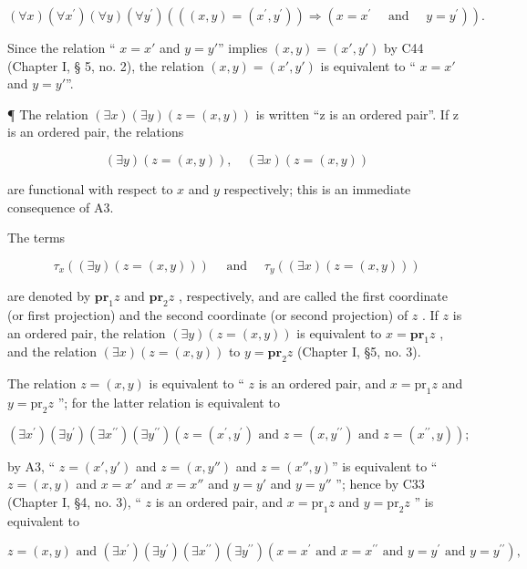 \[
(\forall x) (\forall x ^ {\prime}) (\forall y) (\forall y ^ {\prime}) (((x, y) = (x ^ {\prime}, y ^ {\prime})) \Longrightarrow (x = x ^ {\prime} \quad \text { and } \quad y = y ^ {\prime})). \tag {A3.}
\]

Since the relation `` \(x = x'\) and \(y = y'\)'' implies \((x, y) = (x', y')\) by C44 (Chapter I, § 5, no. 2), the relation \((x, y) = (x', y')\) is equivalent to `` \(x = x'\) and \(y = y'\)''.

¶ The relation \((\exists x)(\exists y)(z=(x,y))\) is written ``z is an ordered pair''. If z is an ordered pair, the relations

\[
(\exists y) (z = (x, y)), \quad (\exists x) (z = (x, y))
\]

are functional with respect to \(x\) and \(y\) respectively; this is an immediate consequence of A3.

The terms

\[
\tau_ {x} ((\exists y) (z = (x, y))) \quad \text { and } \quad \tau_ {y} ((\exists x) (z = (x, y)))
\]

are denoted by \(\mathbf{pr}_1z\) and \(\mathbf{pr}_2z\) , respectively, and are called the first coordinate (or first projection) and the second coordinate (or second projection) of \(z\) . If \(z\) is an ordered pair, the relation \((\exists y)(z = (x, y))\) is equivalent to \(x = \mathbf{pr}_1z\) , and the relation \((\exists x)(z = (x, y))\) to \(y = \mathbf{pr}_2z\) (Chapter I, §5, no. 3).

The relation \(z = (x, y)\) is equivalent to `` \(z\) is an ordered pair, and \(x = \text{pr}_1z\) and \(y = \text{pr}_2z\) ''; for the latter relation is equivalent to

\[
(\exists x ^ {\prime}) (\exists y ^ {\prime}) (\exists x ^ {\prime \prime}) (\exists y ^ {\prime \prime}) (z = (x ^ {\prime}, y ^ {\prime}) \text {   and   } z = (x, y ^ {\prime \prime}) \text {   and   } z = (x ^ {\prime \prime}, y));
\]

by A3, `` \(z = (x', y')\) and \(z = (x, y'')\) and \(z = (x'', y)\)'' is equivalent to `` \(z = (x, y)\) and \(x = x'\) and \(x = x''\) and \(y = y'\) and \(y = y''\) ''; hence by C33 (Chapter I, §4, no. 3), `` \(z\) is an ordered pair, and \(x = \text{pr}_1 z\) and \(y = \text{pr}_2 z\) '' is equivalent to

\[
z = (x, y) \text { and } (\exists x ^ {\prime}) (\exists y ^ {\prime}) (\exists x ^ {\prime \prime}) (\exists y ^ {\prime \prime}) (x = x ^ {\prime} \text { and } x = x ^ {\prime \prime} \text { and } y = y ^ {\prime} \text { and } y = y ^ {\prime \prime}),
\]

